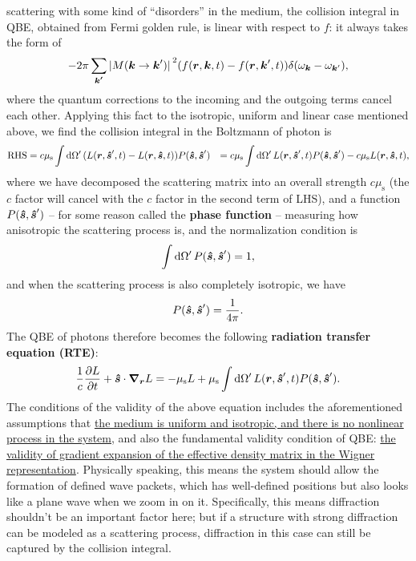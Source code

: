 \documentclass[hyperref, a4paper]{article}
\newcommand*{\concept}[1]{{\textbf{#1}}}
\def\\{}%
\begin{document}
scattering with some kind of ``disorders'' in the medium, 
the collision integral in QBE, obtained from Fermi golden rule, 
is linear with respect to $f$: 
it always takes the form of 
\[
    - 2\pi \sum_{\vb*{k'}} \abs*{M(\vb*{k} \to \vb*{k}')}^2 (f(\vb*{r}, \vb*{k} , t) - f(\vb*{r}, \vb*{k}', t) )
    \delta(\omega_{\vb*{k}} - \omega_{\vb*{k}'}),
\] 
where the quantum corrections to the incoming and the outgoing terms 
cancel each other. 
Applying this fact to the isotropic, uniform and linear case 
mentioned above, we find the collision integral in the 
Boltzmann of photon is 
\begin{equation}
    \begin{aligned}
        \text{RHS} &= c \mu_{\text{s}} \int \dd{\Omega'} (L(\vb*{r}, \vu*{s}', t) - L(\vb*{r}, \vu*{s}, t)) P(\vu*{s}, \vu*{s}') \\
        &= c \mu_{\text{s}} \int \dd{\Omega'} L(\vb*{r}, \vu*{s}', t)  P(\vu*{s}, \vu*{s}')
        - c \mu_{\text{s}} L(\vb*{r}, \vu*{s}, t) ,
    \end{aligned}
\end{equation}
where we have decomposed the scattering matrix 
into an overall strength $c \mu_{\text{s}}$ 
(the $c$ factor will cancel with the $c$ factor in the second term of LHS), 
and a function $P(\vu*{s}, \vu*{s}')$ -- for some reason called the \concept{phase function} -- 
measuring how anisotropic the scattering process is, 
and the normalization condition is 
\begin{equation}
    \int \dd{\Omega'} P(\vu*{s}, \vu*{s}') = 1,
\end{equation}
and when the scattering process is also completely isotropic, we have 
\begin{equation}
    P(\vu*{s}, \vu*{s}') = \frac{1}{4 \pi}.
\end{equation}
The QBE of photons therefore becomes the following 
\concept{radiation transfer equation (RTE)}: 
\begin{equation}
    \frac{1}{c} \pdv{L}{t} + \vu*{s} \cdot \grad_{\vb*{r}} L = 
    - \mu_{\text{s}} L + \mu_{\text{s}} \int \dd{\Omega'} 
    L(\vb*{r}, \vu*{s}', t) P(\vu*{s}, \vu*{s}').
    \label{eq:rad-transfer-1}
\end{equation}
The conditions of the validity of the above equation 
includes the aforementioned assumptions that 
\ul{the medium is uniform and isotropic, 
and there is no nonlinear process in the system,} 
and also the fundamental validity condition of QBE: 
\ul{the validity of gradient expansion of the effective density matrix 
in the Wigner representation}.
Physically speaking, this means the system should allow 
the formation of defined wave packets, 
which has well-defined positions 
but also looks like a plane wave when we zoom in on it.
Specifically, this means diffraction shouldn't be an important factor here;
but if a structure with strong diffraction can be modeled as a scattering process, 
diffraction in this case can still be captured by the collision integral.
\end{document}
